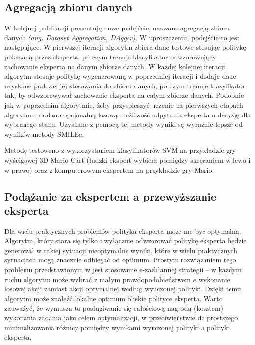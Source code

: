 \subsection{Agregacją zbioru danych}
W kolejnej publikacji \cite{DBLP:journals/corr/abs-1011-0686} prezentują nowe podejście, nazwane agregacją zbioru danych \textit{(ang. Dataset Aggregation, DAgger)}. W uproszczeniu, podejście to jest następujące. W pierwszej iteracji algorytm zbiera dane testowe stosując politykę pokazaną przez eksperta, po czym trenuje klasyfikator odwzorowujący zachowanie eksperta na danym zbiorze danych. W każdej kolejnej iteracji algorytm stosuje politykę wygenerowaną w poprzedniej iteracji i dodaje dane uzyskane podczas jej stosowania do zbioru danych, po czym trenuje klasyfikator tak, by odwzorowywał zachowanie eksperta na całym zbiorze danych. Podobnie jak w poprzednim algorytmie, żeby przyspieszyć uczenie na pierwszych etapach algorytmu, dodano opcjonalną losową możliwość odpytania eksperta o decyzję dla wybranego stanu. Uzyskane z pomocą tej metody wyniki są wyraźnie lepsze od wyników metody SMILEe.

Metodę testowano z wykorzystaniem klasyfikatorów SVM na przykładzie gry wyścigowej 3D Mario Cart (ludzki ekspert wybiera pomiędzy skręcaniem w lewo i w prawo) oraz z komputerowym ekspertem na przykładzie gry Mario.

\subsection{Podążanie za ekspertem a przewyższanie eksperta}
Dla wielu praktycznych problemów polityka eksperta może nie być optymalna. Algorytm, który stara się tylko i wyłącznie odwzorować politykę eksperta będzie generował w takiej sytuacji nieoptymalne wyniki, które w wielu praktycznych sytuacjach mogą znacznie odbiegać od optimum. Prostym rozwiązaniem tego problemu przedstawionym w \cite{DBLP:journals/corr/ChangKADL15} jest stosowanie e-zachłannej strategii – w każdym ruchu algorytm może wybrać z małym prawdopodobieństwem $e$ wykonanie losowej akcji zamiast akcji optymalnej według wyuczonej polityki. Dzięki temu algorytm może znaleźć lokalne optimum bliskie polityce eksperta. Warto zauważyć, że wymusza to posługiwanie się całościową nagrodą (kosztem) wykonania zadania jako celem optymalizacji, w przeciwieństwie do prostszego minimalizowania różnicy pomiędzy wynikami wyuczonej polityki a polityki eksperta.
